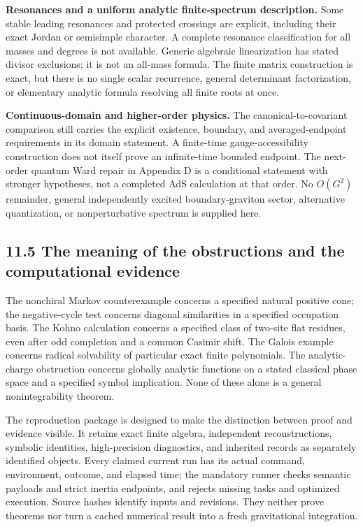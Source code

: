 \textbf{Resonances and a uniform analytic finite-spectrum description.} Some stable leading resonances and protected crossings are explicit, including their exact Jordan or semisimple character. A complete resonance classification for all masses and degrees is not available. Generic algebraic linearization has stated divisor exclusions; it is not an all-mass formula. The finite matrix construction is exact, but there is no single scalar recurrence, general determinant factorization, or elementary analytic formula resolving all finite roots at once.

\textbf{Continuous-domain and higher-order physics.} The canonical-to-covariant comparison still carries the explicit existence, boundary, and averaged-endpoint requirements in its domain statement. A finite-time gauge-accessibility construction does not itself prove an infinite-time bounded endpoint. The next-order quantum Ward repair in Appendix D is a conditional statement with stronger hypotheses, not a completed AdS calculation at that order. No \(O(G^2)\) remainder, general independently excited boundary-graviton sector, alternative quantization, or nonperturbative spectrum is supplied here.

\hypertarget{the-meaning-of-the-obstructions-and-the-computational-evidence}{%
\subsection{11.5 The meaning of the obstructions and the computational evidence}\label{the-meaning-of-the-obstructions-and-the-computational-evidence}}

The nonchiral Markov counterexample concerns a specified natural positive cone; the negative-cycle test concerns diagonal similarities in a specified occupation basis. The Kohno calculation concerns a specified class of two-site flat residues, even after odd completion and a common Casimir shift. The Galois example concerns radical solvability of particular exact finite polynomials. The analytic-charge obstruction concerns globally analytic functions on a stated classical phase space and a specified symbol implication. None of these alone is a general nonintegrability theorem.

The reproduction package is designed to make the distinction between proof and evidence visible. It retains exact finite algebra, independent reconstructions, symbolic identities, high-precision diagnostics, and inherited records as separately identified objects. Every claimed current run has its actual command, environment, outcome, and elapsed time; the mandatory runner checks semantic payloads and strict inertia endpoints, and rejects missing tasks and optimized execution. Source hashes identify inputs and revisions. They neither prove theorems nor turn a cached numerical result into a fresh gravitational integration.


